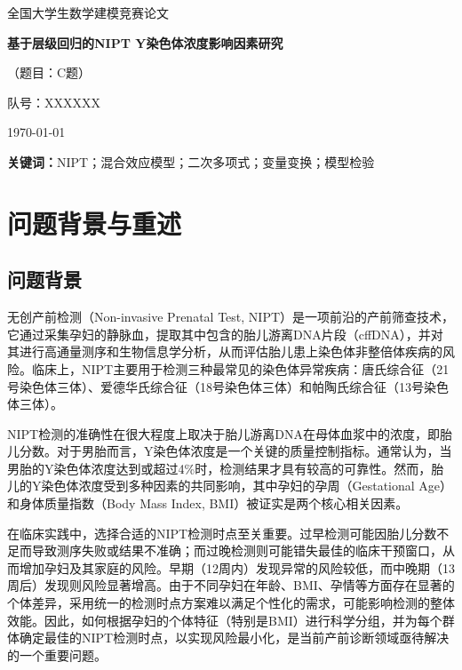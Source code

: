 \documentclass[12pt,a4paper]{ctexart}
\numberwithin{equation}{section}
\theoremstyle{mcm}
\newcommand{\papertitle}{基于层级回归的NIPT Y染色体浓度影响因素研究}
\newcommand{\teamid}{XXXXXX} %
\begin{document}
\begin{titlepage}
  \centering
  {\heiti{} 全国大学生数学建模竞赛论文}\par\vspace{24pt}
  {\bfseries{} \papertitle}\par\vspace{18pt}
  {（题目：C题）}\par\vspace{24pt}
  { 队号：\teamid}\par\vfill
  {\today}
\end{titlepage}
\setcounter{page}{1}

\begin{abstract}
为匹配竞赛评审的阅读习惯，摘要建议控制在\SI{300}{\text{--}\,400}字，交代：问题目标、关键方法（如混合效应模型/广义线性模型/优化求解等）、核心结论与指标（R\textsuperscript{2}、MAE、鲁棒性检验）、应用价值与推广。英文摘要可在附录给出。
\end{abstract}
\textbf{关键词：}NIPT；混合效应模型；二次多项式；变量变换；模型检验

\section{问题背景与重述}

\subsection{问题背景}
无创产前检测（Non-invasive Prenatal Test, NIPT）是一项前沿的产前筛查技术，它通过采集孕妇的静脉血，提取其中包含的胎儿游离DNA片段（cffDNA），并对其进行高通量测序和生物信息学分析，从而评估胎儿患上染色体非整倍体疾病的风险。临床上，NIPT主要用于检测三种最常见的染色体异常疾病：唐氏综合征（21号染色体三体）、爱德华氏综合征（18号染色体三体）和帕陶氏综合征（13号染色体三体）。

NIPT检测的准确性在很大程度上取决于胎儿游离DNA在母体血浆中的浓度，即胎儿分数。对于男胎而言，Y染色体浓度是一个关键的质量控制指标。通常认为，当男胎的Y染色体浓度达到或超过4\%时，检测结果才具有较高的可靠性。然而，胎儿的Y染色体浓度受到多种因素的共同影响，其中孕妇的孕周（Gestational Age）和身体质量指数（Body Mass Index, BMI）被证实是两个核心相关因素。

在临床实践中，选择合适的NIPT检测时点至关重要。过早检测可能因胎儿分数不足而导致测序失败或结果不准确；而过晚检测则可能错失最佳的临床干预窗口，从而增加孕妇及其家庭的风险。早期（12周内）发现异常的风险较低，而中晚期（13周后）发现则风险显著增高。由于不同孕妇在年龄、BMI、孕情等方面存在显著的个体差异，采用统一的检测时点方案难以满足个性化的需求，可能影响检测的整体效能。因此，如何根据孕妇的个体特征（特别是BMI）进行科学分组，并为每个群体确定最佳的NIPT检测时点，以实现风险最小化，是当前产前诊断领域亟待解决的一个重要问题。
\end{document}
